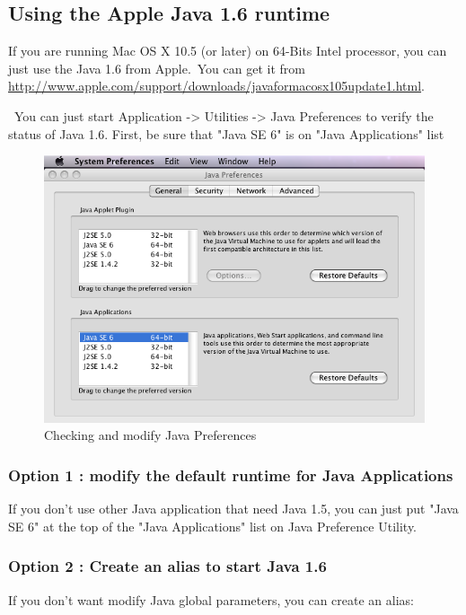 \subsection{Using the Apple Java 1.6 runtime}
\bigskip{}
\noindent If you are running Mac OS X 10.5 (or later) on 64-Bits Intel processor, you can just use the Java 1.6 from Apple.\ You can get it from \url{http://www.apple.com/support/downloads/javaformacosx105update1.html}.

\noindent\ You can just start Application -> Utilities -> Java Preferences to verify the status of Java 1.6. First, be sure that "Java SE 6" is on "Java Applications" list
\begin{figure}[!h]
\begin{center}
\includegraphics[width=13cm]{resources/img/java_pref_osx.png}
\caption{Checking and modify Java Preferences\label{fig-mac0}}
\end{center}
\end{figure}


\subsubsection{Option 1 : modify the default runtime for Java Applications}
\noindent If you don't use other Java application that need Java 1.5, you can just put "Java SE 6" at the top of the "Java Applications" list on Java Preference Utility.

\subsubsection{Option 2 : Create an alias to start Java 1.6}
\noindent If you don't want modify Java global parameters, you can create an
alias:

